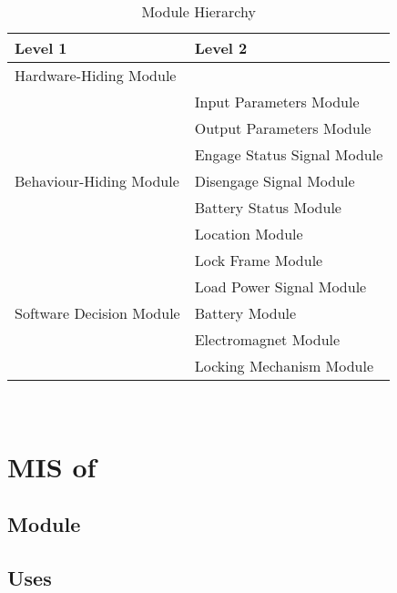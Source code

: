 \documentclass[12pt, titlepage]{article}
\begin{document}
\begin{table}[h!]
\centering
\begin{tabular}{p{} p{}}
\toprule
\textbf{Level 1} & \textbf{Level 2}\\
\midrule

{Hardware-Hiding Module} & ~ \\
\midrule

\multirow{7}{0.3\textwidth}{Behaviour-Hiding Module} & Input Parameters Module \\
& Output Parameters Module \\
& Engage Status Signal Module \\
& Disengage Signal Module \\
& Battery Status Module \\
& Location Module \\ 
& Lock Frame Module \\
\midrule

\multirow{3}{0.3\textwidth}{Software Decision Module} & Load Power Signal Module \\
& Battery Module \\
& Electromagnet Module \\
& Locking Mechanism Module \\
\bottomrule

\end{tabular}
\caption{Module Hierarchy}
\label{TblMH}
\end{table}

\newpage
~\newpage





\section{MIS of } \label{Module} 



\subsection{Module}


\subsection{Uses}
\end{document}
